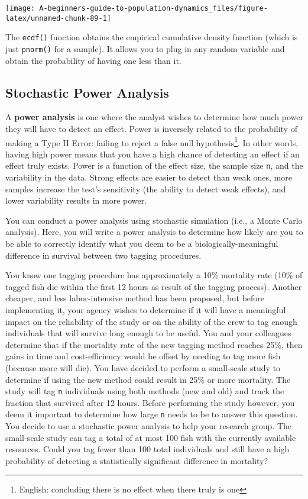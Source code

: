 \documentclass[]{book}
\let\rmarkdownfootnote\footnote%
\def\footnote{\protect\rmarkdownfootnote}
\begin{document}
\begin{center}\texttt{[image: A-beginners-guide-to-population-dynamics\_files/figure-latex/unnamed-chunk-89-1]} \end{center}

The \texttt{ecdf()} function obtains the empirical cumulative density function (which is just \texttt{pnorm()} for a sample). It allows you to plug in any random variable and obtain the probability of having one less than it.

\hypertarget{power-ex}{%
\subsection{Stochastic Power Analysis}\label{power-ex}}

A \textbf{power analysis} is one where the analyst wishes to determine how much power they will have to detect an effect. Power is inversely related to the probability of making a Type II Error: failing to reject a false null hypothesis\footnote{English: concluding there is no effect when there truly is one}. In other words, having high power means that you have a high chance of detecting an effect if an effect truly exists. Power is a function of the effect size, the sample size \texttt{n}, and the variability in the data. Strong effects are easier to detect than weak ones, more samples increase the test's sensitivity (the ability to detect weak effects), and lower variability results in more power.

You can conduct a power analysis using stochastic simulation (i.e., a Monte Carlo analysis). Here, you will write a power analysis to determine how likely are you to be able to correctly identify what you deem to be a biologically-meaningful difference in survival between two tagging procedures.

You know one tagging procedure has approximately a 10\% mortality rate (10\% of tagged fish die within the first 12 hours as result of the tagging process). Another cheaper, and less labor-intensive method has been proposed, but before implementing it, your agency wishes to determine if it will have a meaningful impact on the reliability of the study or on the ability of the crew to tag enough individuals that will survive long enough to be useful. You and your colleagues determine that if the mortality rate of the new tagging method reaches 25\%, then gains in time and cost-efficiency would be offset by needing to tag more fish (because more will die). You have decided to perform a small-scale study to determine if using the new method could result in 25\% or more mortality. The study will tag \texttt{n} individuals using both methods (new and old) and track the fraction that survived after 12 hours. Before performing the study however, you deem it important to determine how large \texttt{n} needs to be to answer this question. You decide to use a stochastic power analysis to help your research group. The small-scale study can tag a total of at most 100 fish with the currently available resources. Could you tag fewer than 100 total individuals and still have a high probability of detecting a statistically significant difference in mortality?
\end{document}
